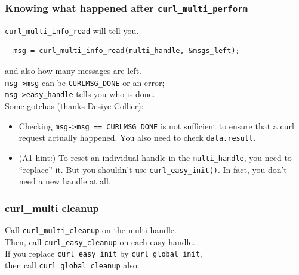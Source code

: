 \begin{frame}[fragile]
  \frametitle{Knowing what happened after {\tt curl\_multi\_perform}}

  
    {\tt curl\_multi\_info\_read} will tell you.
  
\begin{lstlisting}
  msg = curl_multi_info_read(multi_handle, &msgs_left);
\end{lstlisting}
  
    and also how many messages are left.\\[1em]
    {\tt msg->msg} can be {\tt CURLMSG\_DONE} or an error;\\
    {\tt msg->easy\_handle} tells you who is done.\\[1em]
  

    Some gotchas (thanks Desiye Collier):
    \begin{itemize}
    \item Checking \verb+msg->msg == CURLMSG_DONE+ is not sufficient to ensure that a curl request actually happened. You also need to check {\tt data.result}.

    \item (A1 hint:) To reset an individual handle in the {\tt multi\_handle}, you need to ``replace'' it. But you shouldn't use {\tt curl\_easy\_init()}.  In fact, you don't need a new handle at all.
    \end{itemize}
  

\end{frame}



\begin{frame}
  \frametitle{curl\_multi cleanup}

  
    Call {\tt curl\_multi\_cleanup} on the multi handle.\\[1em]
    Then, call {\tt curl\_easy\_cleanup} on each easy handle.\\[2em]
    If you replace {\tt curl\_easy\_init} by {\tt curl\_global\_init},\\
    then call {\tt curl\_global\_cleanup} also.
  

\end{frame}

